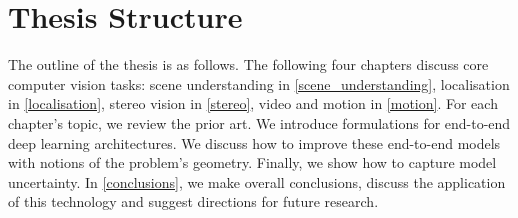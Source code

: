 \section{Thesis Structure}

The outline of the thesis is as follows. The following four chapters discuss core computer vision tasks: scene understanding in \cref{scene_understanding}, localisation in \cref{localisation}, stereo vision in \cref{stereo}, video and motion in \cref{motion}. For each chapter’s topic, we review the prior art. We introduce formulations for end-to-end deep learning architectures. We discuss how to improve these end-to-end models with notions of the problem’s geometry. Finally, we show how to capture model uncertainty. In \cref{conclusions}, we make overall conclusions, discuss the application of this technology and suggest directions for future research.